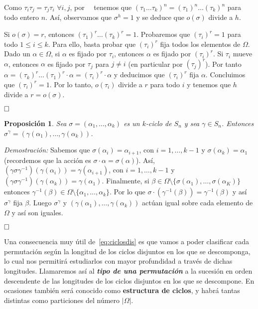 \documentclass[12pt]{article}
\newtheorem{proposition}[theorem]{Proposición}
\begin{document}
Como $\tau_i\tau_j = \tau_j \tau_i$ $\forall i,j$, por~~ tenemos que $(\tau_1 \ldots \tau_k)^n= (\tau_1)^n \ldots (\tau_k)^n$ para todo entero $n$. Así, observamos que $\sigma^h = 1$ y se deduce que $o(\sigma)$ divide a $h$.

Si $o(\sigma) = r$, entonces $(\tau_1)^r\ldots (\tau_k)^r = 1$. Probaremos que $(\tau_i)^r=1$ para todo $1 \leq i \leq k$. Para ello, basta probar que $(\tau_i)^r$ fija todos los elementos de $\Omega$. Dado un $\alpha \in \Omega$, si $\alpha$ es fijado por $\tau_i$, entonces $\alpha$ es fijado por $(\tau_i)^r$. Si $\tau_i$ mueve $\alpha$, entonces $\alpha$ es fijado por $\tau_j$ para $j \neq i$ (en particular por $(\tau_j)^r$). Por tanto $\alpha = (\tau_k)^r \ldots (\tau_1)^r \cdot \alpha = (\tau_i)^r \cdot \alpha$ y deducimos que $(\tau_i)^r$ fija $\alpha$. Concluimos que $(\tau_i)^r = 1$. Por lo tanto, $o(\tau_i)$ divide a $r$ para todo $i$ y tenemos que $h$ divide a $r = o(\sigma).$


$\hfill \square$

\begin{proposition}Sea $\sigma = (\alpha_1, \ldots, \alpha_k)$ es un $k$-ciclo de $S_n$ y sea $\gamma \in S_n$. Entonces $\sigma^\gamma = (\gamma(\alpha_1), \ldots, \gamma(\alpha_k))$.
\end{proposition}
\emph{Demostración: }Sabemos que $\sigma(\alpha_i) = \alpha_{i+1}$, con $i=1, \ldots, k-1$ y $\sigma(\alpha_k)= \alpha_1$ (recordemos que la acción es $\sigma \cdot \alpha = \sigma(\alpha)$). Así, $(\gamma \sigma \gamma^{-1}) (\gamma(\alpha_i)) = \gamma(\alpha_{i+1})$, con $i=1, \ldots, k-1$ y $(\gamma \sigma \gamma^{-1}) (\gamma(\alpha_k)) = \gamma(\alpha_{1})$. Finalmente, si $\beta \in \Omega \setminus \lbrace \sigma(\alpha_1), \ldots, \sigma(\alpha_K) \rbrace$ entonces $\gamma^{-1}(\beta) \in \Omega \setminus \lbrace \alpha_1, \ldots, \alpha_k \rbrace$. Por lo que $\sigma \cdot (\gamma^{-1} (\beta)) = \gamma^{-1}(\beta)$ y así $\sigma^\gamma$ fija $\beta$. Luego $\sigma^\gamma$ y $(\gamma(\alpha_1), \ldots, \gamma(\alpha_k))$ actúan igual sobre cada elemento de $\Omega$ y así son iguales.

$\hfill \square$

Una consecuencia muy útil de~\ref{eq:ciclosdis} es que vamos a poder clasificar cada permutación según la longitud de los ciclos disjuntos en los que se descomponga, lo cual nos permitirá estudiarlos con mayor profundidad a través de dichas longitudes. Llamaremos así al \textbf{\textit{tipo de una permutación}} a la sucesión en orden descendente de las longitudes de los ciclos disjuntos en los que se descompone. En ocasiones también será conocido como \textbf{estructura de ciclos}, y habrá tantas distintas como particiones del número $|\Omega|$.
\end{document}

